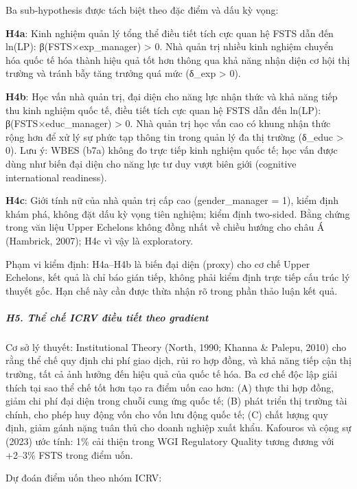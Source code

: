 \documentclass[12pt,a4paper]{article}
\begin{document}
Ba sub-hypothesis được tách biệt theo đặc điểm và dấu kỳ vọng:

\textbf{H4a}: Kinh nghiệm quản lý tổng thể điều tiết tích cực quan hệ
FSTS dẫn đến ln(LP): β(FSTS×exp\_manager) \textgreater{} 0. Nhà quản trị
nhiều kinh nghiệm chuyển hóa quốc tế hóa thành hiệu quả tốt hơn thông
qua khả năng nhận diện cơ hội thị trường và tránh bẫy tăng trưởng quá
mức (δ\_exp \textgreater{} 0).

\textbf{H4b}: Học vấn nhà quản trị, đại diện cho năng lực nhận thức và
khả năng tiếp thu kinh nghiệm quốc tế, điều tiết tích cực quan hệ FSTS
dẫn đến ln(LP): β(FSTS×educ\_manager) \textgreater{} 0. Nhà quản trị học
vấn cao có khung nhận thức rộng hơn để xử lý sự phức tạp thông tin trong
quản lý đa thị trường (δ\_educ \textgreater{} 0). Lưu ý: WBES (b7a)
không đo trực tiếp kinh nghiệm quốc tế; học vấn được dùng như biến đại
diện cho năng lực tư duy vượt biên giới (cognitive international
readiness).

\textbf{H4c}: Giới tính nữ của nhà quản trị cấp cao (gender\_manager =
1), kiểm định khám phá, không đặt dấu kỳ vọng tiên nghiệm; kiểm định
two-sided. Bằng chứng trong văn liệu Upper Echelons không đồng nhất về
chiều hướng cho châu Á (Hambrick, 2007); H4c vì vậy là exploratory.

Phạm vi kiểm định: H4a--H4b là biến đại diện (proxy) cho cơ chế Upper
Echelons, kết quả là chỉ báo gián tiếp, không phải kiểm định trực tiếp
cấu trúc lý thuyết gốc. Hạn chế này cần được thừa nhận rõ trong phần
thảo luận kết quả.

\hypertarget{h5-thux1ec3-chux1ebf-icrv-ux111iux1ec1u-tiux1ebft-theo-gradient}{%
\subparagraph{H5. Thể chế ICRV điều tiết theo
gradient}\label{h5-thux1ec3-chux1ebf-icrv-ux111iux1ec1u-tiux1ebft-theo-gradient}}

Cơ sở lý thuyết: Institutional Theory (North, 1990; Khanna \& Palepu,
2010) cho rằng thể chế quy định chi phí giao dịch, rủi ro hợp đồng, và
khả năng tiếp cận thị trường, tất cả ảnh hưởng đến hiệu quả của quốc tế
hóa. Ba cơ chế độc lập giải thích tại sao thể chế tốt hơn tạo ra điểm
uốn cao hơn: (A) thực thi hợp đồng, giảm chi phí đại diện trong chuỗi
cung ứng quốc tế; (B) phát triển thị trường tài chính, cho phép huy động
vốn cho vốn lưu động quốc tế; (C) chất lượng quy định, giảm gánh nặng
tuân thủ cho doanh nghiệp xuất khẩu. Kafouros và cộng sự (2023) ước
tính: 1\% cải thiện trong WGI Regulatory Quality tương đương với +2--3\%
FSTS trong điểm uốn.

Dự đoán điểm uốn theo nhóm ICRV:
\end{document}
